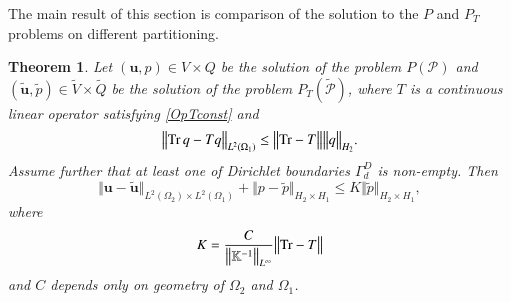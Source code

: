 \documentclass{elsarticle}
\newtheorem{thm}{Theorem}[section]
\def\Tr{{\rm Tr}}
\def\vc#1{\mathbf{\boldsymbol{#1}}}     %
\def\tn#1{{\mathbb{#1}}}    %
\def\norm#1{\bigl\Vert#1\bigr\Vert} %
\def\vl{{\vc{u}}}
\begin{document}
The main result of this section is comparison of the solution to the $P$ and $P_T$ problems on different partitioning. 


\begin{thm}
 Let $(\vl,p)\in V\times Q$ be the solution of the problem $P(\mathcal P)$ and $(\tilde\vl,\tilde p)\in \tilde V\times \tilde Q$ be the solution of the problem $P_T(\tilde{\mathcal P})$, where $T$ is a continuous linear operator satisfying \eqref{OpTconst} and
 \begin{equation}\label{Tapprox}
    \norm{\Tr\, q - T q}_{L^2(\Omega_1)} \le \norm{\Tr-T} \norm{q}_{H_2}.
 \end{equation}
Assume further that at least one of Dirichlet boundaries $\Gamma_d^D$ is non-empty.
Then 
\begin{equation}\label{MainEstimate}
  \norm{\vl-\tilde\vl}_{L^2(\Omega_2)\times L^2(\Omega_1)}+\norm{p-\tilde p}_{H_2\times H_1} \le
     K\norm{\tilde p}_{H_2\times H_1},
\end{equation}
where
\[
  K=\frac{C}{\norm{\tn K^{-1}}_{L^\infty}} \norm{\Tr - T}
\]
and $C$ depends only on geometry of $\Omega_2$ and $\Omega_1$.
\end{thm}
\end{document}
